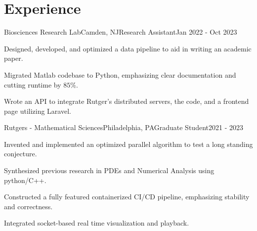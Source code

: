 \thispagestyle{empty}

\section{Experience}

\begin{role}{Biosciences Research Lab}{Camden, NJ}{Research Assistant}{Jan 2022 - Oct 2023}
  \item Designed, developed, and optimized a data pipeline to aid in writing an academic paper.
  \item Migrated Matlab codebase to Python, emphasizing clear documentation and cutting runtime by $85\%$.
  \item Wrote an API to integrate Rutger's distributed servers, the code, and a frontend page utilizing Laravel.
\end{role}

\begin{role}{Rutgers - Mathematical Sciences}{Philadelphia, PA}{Graduate Student}{2021 - 2023}
  \item Invented and implemented an optimized parallel algorithm to test a long standing conjecture.
  \item Synthesized previous research in PDEs and Numerical Analysis using python/C++.
  \item Constructed a fully featured containerized CI/CD pipeline, emphasizing stability and correctness.
  \item Integrated socket-based real time visualization and playback.
\end{role}

